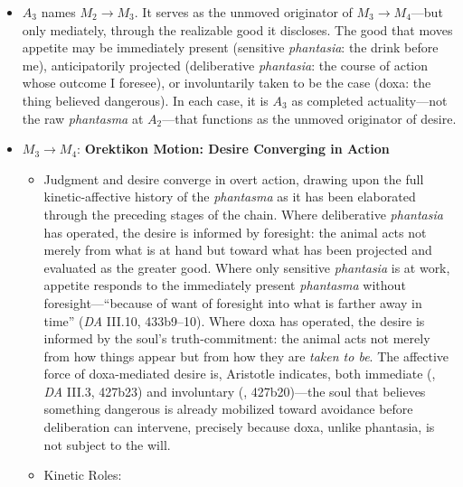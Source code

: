 \begin{itemize}
\begin{itemize}
          \item $A_3$ names $M_2 \rightarrow M_3$. It serves as the unmoved
          originator of $M_3 \rightarrow M_4$---but only mediately, through the
          realizable good it discloses. The good that moves appetite may be
          immediately present (sensitive \textit{phantasia}: the drink before me),
          anticipatorily projected (deliberative \textit{phantasia}: the course of
          action whose outcome I foresee), or involuntarily taken to be the case
          (doxa: the thing believed dangerous). In each case, it is $A_3$ as
          completed actuality---not the raw \textit{phantasma} at $A_2$---that
          functions as the unmoved originator of desire.
          \item $M_3 \rightarrow M_4$: \textbf{Orektikon Motion: Desire Converging
          in Action}
          \begin{itemize}
              \item Judgment and desire converge in overt action, drawing upon the
              full kinetic-affective history of the \textit{phantasma} as it has been
              elaborated through the preceding stages of the chain. Where deliberative
              \textit{phantasia} has operated, the desire is informed by foresight:
              the animal acts not merely from what is at hand but toward what has been
              projected and evaluated as the greater good. Where only sensitive
              \textit{phantasia} is at work, appetite responds to the immediately
              present \textit{phantasma} without foresight---``because of want of
              foresight into what is farther away in time'' (\textit{DA} III.10,
              433b9--10). Where doxa has operated, the desire is informed by the
              soul's truth-commitment: the animal acts not merely from how things
              appear but from how they are \textit{taken to be}. The affective force
              of doxa-mediated desire is, Aristotle indicates, both immediate
              (, \textit{DA} III.3, 427b23) and involuntary
              (, 427b20)---the soul that believes something
              dangerous is already mobilized toward avoidance before deliberation can
              intervene, precisely because doxa, unlike phantasia, is not subject to
              the will.
              \item Kinetic Roles:

\end{itemize}
\end{itemize}
\end{itemize}

